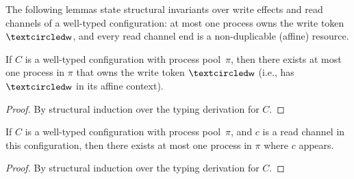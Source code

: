 The following lemmas state structural invariants over write effects and read
channels of a well-typed configuration: at most one process owns the write token
$\wrtok$, and every read channel end is a non-duplicable (affine) resource.


\begin{lemma}
\label{lem:UniqueWriter}
If $C$ is a well-typed configuration with process pool~$\pi$, then there exists at
most one process in $\pi$ that owns the write token $\wrtok$ (i.e., has $\wrtok$
in its affine context).
\begin{proof}
By structural induction over the typing derivation for $C$.
\end{proof}
\end{lemma}

\begin{lemma}
\label{lem:UniqueReader}
If $C$ is a well-typed configuration with process pool~$\pi$, 
and $c$ is a read channel in this configuration,
then there exists at most one process in $\pi$ where $c$ appears.
\begin{proof}
By structural induction over the typing derivation for $C$.
\end{proof}
\end{lemma}

